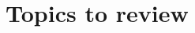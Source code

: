 \documentclass[
10pt, %
a4paper, %
oneside, %
headinclude,footinclude, %
BCOR5mm, %
]{scrartcl}
\begin{document}
\section{Topics to review}


\renewcommand{\refname}{\spacedlowsmallcaps{References}} %




\end{document}
